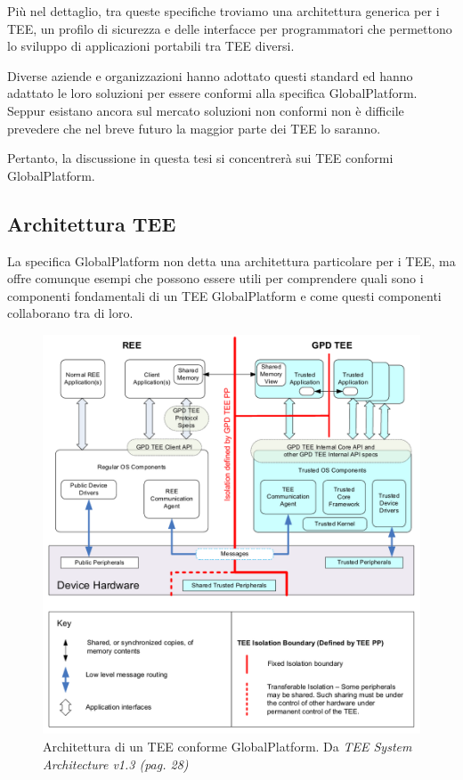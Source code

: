 \documentclass[12pt,italian]{report}
\begin{document}
Più nel dettaglio, tra queste specifiche troviamo una architettura
generica per i TEE, un profilo di sicurezza e delle interfacce per
programmatori che permettono lo sviluppo di applicazioni portabili tra TEE
diversi. 

Diverse aziende e organizzazioni hanno adottato questi standard
ed hanno adattato le loro soluzioni per essere conformi alla specifica
GlobalPlatform.
Seppur esistano ancora sul mercato soluzioni non conformi non è difficile
prevedere che nel breve futuro la maggior parte dei TEE lo saranno.

Pertanto, la discussione in questa tesi si concentrerà sui
TEE conformi GlobalPlatform.

\subsection{Architettura TEE}
\label{subsec:architettura-tee}

La specifica GlobalPlatform non detta una architettura particolare per i
TEE, ma offre comunque esempi che possono essere utili per comprendere
quali sono i componenti fondamentali di un TEE GlobalPlatform e come
questi componenti collaborano tra di loro.

\begin{figure}
    \centering
    \includegraphics[width=1\textwidth]{immagini/tee-system-architecture}
    \caption{
        Architettura di un TEE conforme GlobalPlatform. 
        Da \textit{TEE System Architecture v1.3 (pag. 28)}
        \cite{gp2020systemarchitecture}
    }
    \label{fig:tee-system-architecture}
\end{figure}
\end{document}
